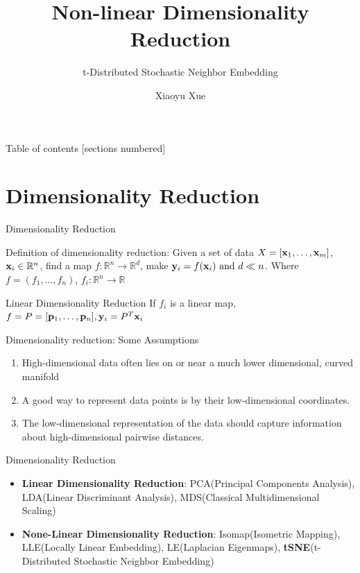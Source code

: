 \documentclass[10pt]{beamer}
\title{Non-linear Dimensionality Reduction}
\subtitle{t-Distributed Stochastic Neighbor Embedding}
\date{}
\author{Xiaoyu Xue}
\institute{Microsoft BingAds UCM}
\begin{document}
\maketitle

\begin{frame}{Table of contents}
  [sections numbered]
  \tableofcontents[hideallsubsections]
\end{frame}

\section{Dimensionality Reduction}
\begin{frame}{Dimensionality Reduction}
\begin{block}{Definition of dimensionality reduction:}
Given a set of data $X = [\bold{x}_1,\ldots,\bold{x}_m]$, $\bold{x}_i \in \mathbb{R}^n$, find a map $f: \mathbb{R}^n \to \mathbb{R}^d$, make $\bold{y}_i = f(\bold{x}_i) \textrm{ and } d\ll n$. Where $f = (f_1, \ldots, f_n)$, $f_i: \mathbb{R}^n \to \mathbb{R}$
\end{block}
\bigskip
\begin{block}{Linear Dimensionality Reduction}
If $f_i$ is a linear map, $f = P = [\bold{p}_1, \ldots, \bold{p}_n], \bold{y}_i = P^T\bold{x}_i$
\end{block}
\end{frame}

\begin{frame}{Dimensionality reduction: Some Assumptions }
\begin{enumerate}
\setlength{\itemsep}{5pt}
\setlength{\parsep}{5pt}
\setlength{\parskip}{5pt}
	\item High-dimensional data often lies on or near a much lower dimensional, curved manifold 
	\item A good way to represent data points is by their low-dimensional coordinates.
	\item The low-dimensional representation of the data should capture information about high-dimensional pairwise distances. 
\end{enumerate}
\end{frame}

\begin{frame}{Dimensionality Reduction}
\begin{itemize}
\setlength{\itemsep}{12pt}
\setlength{\parsep}{12pt}
\setlength{\parskip}{12pt}
	\item \textbf{Linear Dimensionality Reduction}: PCA(Principal Components Analysis), LDA(Linear Discriminant Analysis), MDS(Classical Multidimensional Scaling) 
	\item \textbf{None-Linear Dimensionality Reduction}: Isomap(Isometric Mapping), LLE(Locally Linear Embedding), LE(Laplacian Eigenmaps), \textbf{tSNE}(t-Distributed Stochastic Neighbor Embedding)
\end{itemize}
\end{frame}
\end{document}
